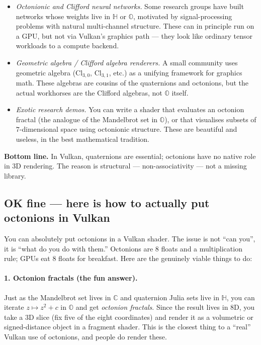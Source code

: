 \documentclass[11pt]{article}
\newcommand{\C}{\mathbb{C}}
\newcommand{\HH}{\mathbb{H}}
\newcommand{\OO}{\mathbb{O}}
\begin{document}
\begin{itemize}[leftmargin=*, itemsep=2pt]
  \item \emph{Octonionic and Clifford neural networks.} Some
        research groups have built networks whose weights live in
        $\HH$ or $\OO$, motivated by signal-processing problems with
        natural multi-channel structure. These can in principle run
        on a GPU, but not via Vulkan's graphics path --- they look
        like ordinary tensor workloads to a compute backend.
  \item \emph{Geometric algebra / Clifford algebra renderers.}
        A small community uses geometric algebra
        ($\mathrm{Cl}_{3,0}$, $\mathrm{Cl}_{3,1}$, etc.) as a unifying
        framework for graphics math. These algebras are cousins of
        the quaternions and octonions, but the actual workhorses are
        the Clifford algebras, not $\OO$ itself.
  \item \emph{Exotic research demos.} You can write a shader that
        evaluates an octonion fractal (the analogue of the Mandelbrot
        set in $\OO$), or that visualises subsets of
        $7$-dimensional space using octonionic structure. These are
        beautiful and useless, in the best mathematical tradition.
\end{itemize}

\textbf{Bottom line.} In Vulkan, quaternions are essential; octonions
have no native role in $3$D rendering. The reason is structural ---
non-associativity --- not a missing library.

\subsection*{OK fine --- here is how to actually put octonions in Vulkan}

You can absolutely put octonions in a Vulkan shader. The issue is not
``can you'', it is ``what do you do with them.'' Octonions are 8
floats and a multiplication rule; GPUs eat 8 floats for breakfast.
Here are the genuinely viable things to do:

\paragraph{1. Octonion fractals (the fun answer).}
Just as the Mandelbrot set lives in $\C$ and quaternion Julia sets
live in $\HH$, you can iterate $z \mapsto z^2 + c$ in $\OO$ and get
\emph{octonion fractals}. Since the result lives in $8$D, you take a
$3$D slice (fix five of the eight coordinates) and render it as a
volumetric or signed-distance object in a fragment shader. This is
the closest thing to a ``real'' Vulkan use of octonions, and people
do render these.
\end{document}

